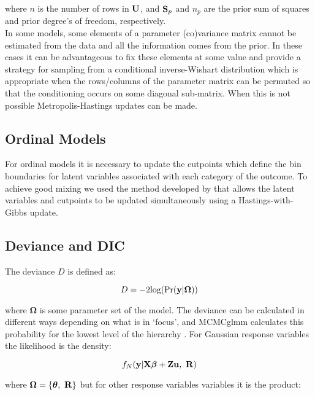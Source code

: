 \documentclass{article}
\begin{document}
where $n$ is the number of rows in ${\bf U}$, and ${\bf S}_{p}$ and $n_{p}$ are the prior sum of squares and prior degree's of freedom, respectively.\\

In some models, some elements of a parameter (co)variance matrix cannot be estimated from the data and all the information comes from the prior. In these cases it can be advantageous to fix these elements at some value and \citet{Korsgaard.1999} provide a strategy for sampling from a conditional inverse-Wishart distribution which is appropriate when the rows/columns of the parameter matrix can be permuted so that the conditioning occurs on some diagonal sub-matrix. When this is not possible Metropolis-Hastings updates can be made. 

\subsection{Ordinal Models}

For ordinal models it is necessary to update the cutpoints which define the bin boundaries for latent variables associated with each category of the outcome.  To achieve good mixing we used the method developed by \citep{Cowles.1996} that allows the latent variables and cutpoints to be updated simultaneously using a Hastings-with-Gibbs update.


\subsection{Deviance and DIC}

The deviance $D$ is defined as:

\begin{equation}
D = -2\textrm{log}(\Pr({\bf y} | {\bm \Omega}))
\end{equation}

where ${\bm \Omega}$ is some parameter set of the model.  The deviance can be calculated in different ways depending on what is in `focus', and MCMCglmm calculates this probability for the lowest level of the hierarchy \citep{Spiegelhalter.2002}. For Gaussian response variables the likelihood is the density:

\begin{equation}
f_{N}({\bf y} | {\bf X}{\bm \beta}+{\bf Z}{\bf u},\ {\bf R}) 
\end{equation}

where ${\bm \Omega} = \left\{{\bm \theta},\ {\bf R}\right\}$ but for other response variables variables it is the product:
\end{document}
